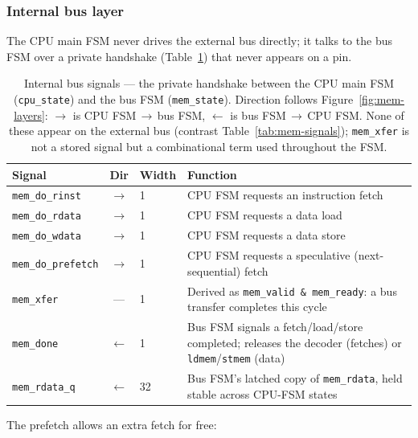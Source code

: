 \documentclass[9pt, a4paper]{extarticle}
\begin{document}
\subsubsection{Internal bus layer}

The CPU main FSM never drives the external bus directly; it talks to the bus FSM over a private handshake (Table~\ref{tab:mem-internal}) that never appears on a pin.

\begin{table}[htbp]
\centering\small
\begin{tabular}{@{}l c l p{6.3cm}@{}}
    \toprule
    Signal & Dir & Width & Function \\
    \midrule
    \texttt{mem\_do\_rinst}    & $\to$ & 1  & CPU FSM requests an instruction fetch \\
    \texttt{mem\_do\_rdata}    & $\to$ & 1  & CPU FSM requests a data load \\
    \texttt{mem\_do\_wdata}    & $\to$ & 1  & CPU FSM requests a data store \\
    \texttt{mem\_do\_prefetch} & $\to$ & 1  & CPU FSM requests a speculative (next-sequential) fetch \\
    \midrule
    \texttt{mem\_xfer}     & ---          & 1  & Derived as \texttt{mem\_valid \& mem\_ready}: a bus transfer completes this cycle \\
    \texttt{mem\_done}     & $\leftarrow$ & 1  & Bus FSM signals a fetch/load/store completed; releases the decoder (fetches) or \texttt{ldmem}/\texttt{stmem} (data) \\
    \texttt{mem\_rdata\_q} & $\leftarrow$ & 32 & Bus FSM's latched copy of \texttt{mem\_rdata}, held stable across CPU-FSM states \\
    \bottomrule
\end{tabular}
\caption{Internal bus signals --- the private handshake between the CPU main FSM (\texttt{cpu\_state}) and the bus FSM (\texttt{mem\_state}). Direction follows Figure~\ref{fig:mem-layers}: \texttt{$\to$} is CPU FSM\,$\to$\,bus FSM, \texttt{$\leftarrow$} is bus FSM\,$\to$\,CPU FSM. None of these appear on the external bus (contrast Table~\ref{tab:mem-signals}); \texttt{mem\_xfer} is not a stored signal but a combinational term used throughout the FSM.}
\label{tab:mem-internal}
\end{table}

The prefetch allows an extra fetch for free:
\end{document}
